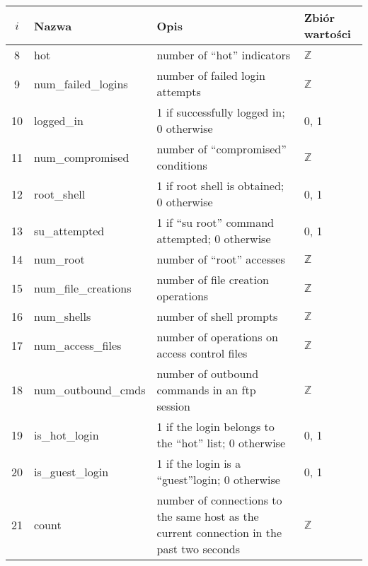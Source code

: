 \documentclass[a4paper, 12pt]{article}
\begin{document}
\begin{tabular}{ | c | l | p{} | p{} | } \hline
$i$ & Nazwa & Opis & Zbiór wartości \\ \hline
8      & hot & number of ``hot'' indicators  & $\mathbb{Z}$ \\ \hline
9      & num\_failed\_logins  & number of failed login attempts   & $\mathbb{Z}$ \\ \hline
10      & logged\_in  & 1 if successfully logged in; 0 otherwise   &  0, 1 \\ \hline
11      & num\_compromised & number of ``compromised'' conditions   &  $\mathbb{Z}$ \\ \hline
12      & root\_shell  & 1 if root shell is obtained; 0 otherwise  &  0, 1 \\ \hline
13      & su\_attempted  & 1 if ``su root'' command attempted; 0 otherwise &  0, 1 \\ \hline
14      & num\_root  & number of ``root'' accesses   & $\mathbb{Z}$ \\ \hline
15      & num\_file\_creations  & number of file creation operations   & $\mathbb{Z}$ \\ \hline
16      & num\_shells  & number of shell prompts  & $\mathbb{Z}$ \\ \hline
17      & num\_access\_files  & number of operations on access control files  & $\mathbb{Z}$ \\ \hline
18      & num\_outbound\_cmds & number of outbound commands in an ftp session   & $\mathbb{Z}$ \\ \hline
19      & is\_hot\_login  & 1 if the login belongs to the ``hot'' list; 0 otherwise   &  0, 1 \\ \hline
20      & is\_guest\_login  & 1 if the login is a ``guest''login; 0 otherwise  &  0, 1 \\ \hline
21     & count & number of connections to the same host as the current connection in the past two seconds  & $\mathbb{Z}$ \\ \hline
\end{tabular}
\end{document}
